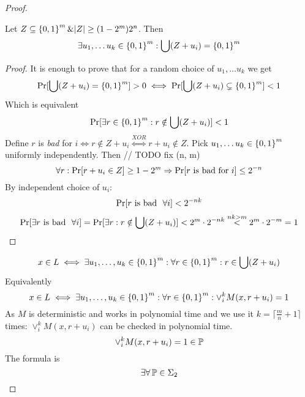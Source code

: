 \begin{proof}
	\begin{lemma}
		Let $Z \subseteq \operatorname{\{ 0, 1 \}}^m \& |Z| \geq (1 - 2^m) 2^n$.
		Then
		\[ \exists u_1, \ldots u_k \in \operatorname{\{ 0, 1 \}}^m: \bigcup (Z + u_i) = \operatorname{\{ 0, 1 \}}^m \]
	\end{lemma}
	\begin{proof}
		It is enough to prove that for a random choice of $u_1, \ldots u_k$ we get
		\[ \operatorname{Pr}[\bigcup (Z + u_i) = \operatorname{\{ 0, 1 \}}^m] > 0 \iff \operatorname{Pr}[\bigcup (Z + u_i) \subsetneq \operatorname{\{ 0, 1 \}}^m] < 1 \]
		Which is equivalent
		\[ \operatorname{Pr}[\exists r \in \operatorname{\{ 0, 1 \}}^m : r \notin \bigcup (Z + u_i)] < 1 \]
	Define $r$ is \emph{bad} for $i \iff r \notin Z + u_i \stackrel{XOR}{\iff} r + u_i \notin Z$.
	Pick $u_1, \ldots u_k \in \operatorname{\{ 0, 1 \}}^m$ uniformly independently.
	Then // TODO fix (n, m)
	\[ \forall r: \operatorname{Pr}[r + u_i \in Z] \geq 1 - 2^m \Rightarrow \operatorname{Pr}[r \ \text{is bad for}\ i] \leq  2^{-n} \]
	By independent choice of $u_i$:
	\[ \operatorname{Pr}[r \ \text{is bad }\ \forall i] < 2^{-nk} \]
	\[ \operatorname{Pr}[\exists r \ \text{is bad }\ \forall i] = \operatorname{Pr}[\exists r: r \notin \bigcup (Z + u_i)] < 2^m \cdot 2^{-nk} \stackrel{nk > m}{<} 2^m \cdot 2^{-m} = 1 \]
	\end{proof}

	\[ x \in L \iff \exists u_1, \ldots, u_k \in \operatorname{\{ 0, 1 \}}^m: \forall r \in \operatorname{\{ 0, 1 \}}^m: r \in \bigcup (Z + u_i) \]
	Equivalently
	\[ x \in L \iff \exists u_1, \ldots, u_k \in \operatorname{\{ 0, 1 \}}^m: \forall r \in \operatorname{\{ 0, 1 \}}^m: \vee_i^k M(x, r + u_i) = 1 \]
	As $M$ is deterministic and works in polynomial time and we use it $k = \lceil \frac{m}{n} + 1 \rceil$ times: $\vee_i^k M(x, r + u_i)$ can be checked in polynomial time.
	\[ \vee_i^k M(x, r + u_i) = 1 \in \operatorname{\mathbb{P}} \]
	The formula is
	\[ \exists \forall \operatorname{\mathbb{P}} \in \Sigma_2 \]


\end{proof}

